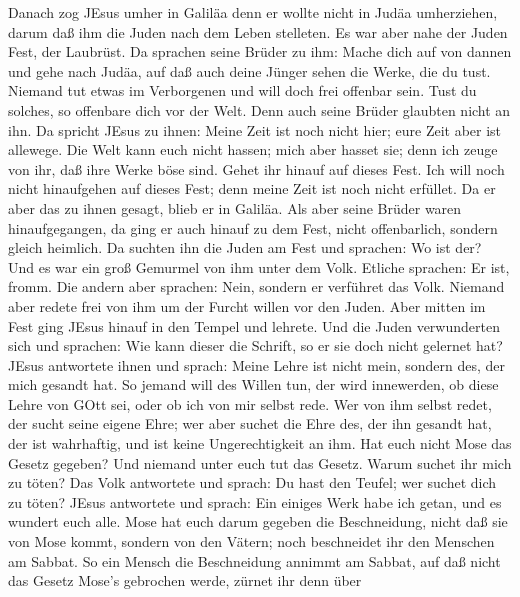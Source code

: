  Danach zog JEsus umher in Galiläa denn er wollte nicht in
Judäa umherziehen, darum daß ihm die Juden nach dem Leben stelleten.
 Es war aber nahe der Juden Fest, der Laubrüst. 
Da sprachen seine Brüder zu ihm: Mache dich auf von dannen und gehe nach
Judäa, auf daß auch deine Jünger sehen die Werke, die du tust.
 Niemand tut etwas im Verborgenen und will doch frei
offenbar sein. Tust du solches, so offenbare dich vor der Welt.
 Denn auch seine Brüder glaubten nicht an ihn. 
Da spricht JEsus zu ihnen: Meine Zeit ist noch nicht hier; eure Zeit
aber ist allewege.  Die Welt kann euch nicht hassen; mich
aber hasset sie; denn ich zeuge von ihr, daß ihre Werke böse sind.
 Gehet ihr hinauf auf dieses Fest. Ich will noch nicht
hinaufgehen auf dieses Fest; denn meine Zeit ist noch nicht erfüllet.
 Da er aber das zu ihnen gesagt, blieb er in Galiläa.
 Als aber seine Brüder waren hinaufgegangen, da ging er
auch hinauf zu dem Fest, nicht offenbarlich, sondern gleich heimlich.
 Da suchten ihn die Juden am Fest und sprachen: Wo ist der?
 Und es war ein groß Gemurmel von ihm unter dem Volk.
Etliche sprachen: Er ist, fromm. Die andern aber sprachen: Nein, sondern
er verführet das Volk.  Niemand aber redete frei von ihm um
der Furcht willen vor den Juden.  Aber mitten im Fest ging
JEsus hinauf in den Tempel und lehrete.  Und die Juden
verwunderten sich und sprachen: Wie kann dieser die Schrift, so er sie
doch nicht gelernet hat?  JEsus antwortete ihnen und
sprach: Meine Lehre ist nicht mein, sondern des, der mich gesandt hat.
 So jemand will des Willen tun, der wird innewerden, ob
diese Lehre von GOtt sei, oder ob ich von mir selbst rede. 
Wer von ihm selbst redet, der sucht seine eigene Ehre; wer aber suchet
die Ehre des, der ihn gesandt hat, der ist wahrhaftig, und ist keine
Ungerechtigkeit an ihm.  Hat euch nicht Mose das Gesetz
gegeben? Und niemand unter euch tut das Gesetz. Warum suchet ihr mich zu
töten?  Das Volk antwortete und sprach: Du hast den Teufel;
wer suchet dich zu töten?  JEsus antwortete und sprach: Ein
einiges Werk habe ich getan, und es wundert euch alle. 
Mose hat euch darum gegeben die Beschneidung, nicht daß sie von Mose
kommt, sondern von den Vätern; noch beschneidet ihr den Menschen am
Sabbat.  So ein Mensch die Beschneidung annimmt am Sabbat,
auf daß nicht das Gesetz Mose's gebrochen werde, zürnet ihr denn über
